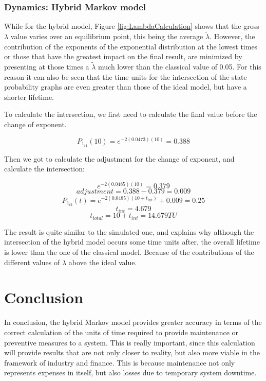 \documentclass{article}
\begin{document}
\begin{doublespacing}
\subsubsection{Dynamics: Hybrid Markov model}

\par While for the hybrid model, Figure \ref{fig:LambdaCalculation} shows that the gross $\lambda$ value varies over an equilibrium point, this being the average $\tilde{\lambda}$. However, the contribution of the exponents of the exponential distribution at the lowest times or those that have the greatest impact on the final result, are minimized by presenting at those times a $\tilde{\lambda}$ much lower than the classical value of 0.05. For this reason it can also be seen that the time units for the intersection of the state probability graphs are even greater than those of the ideal model, but have a shorter lifetime.

\par To calculate the intersection, we first need to calculate the final value before the change of exponent.

$$ P_{1_{t1}} (10)=e^{-2(0.0473)(10)}=0.388$$

\par Then we got to calculate the adjustment for the change of exponent, and calculate the intersection:

$$ e^{-2(0.0485)(10)}=0.379$$
$$ \textit{adjustment}= 0.388-0.379=0.009$$
$$ P_{1_{t2}} (t)=e^{-2(0.0485)(10+t_{int})}+0.009=0.25$$
$$ t_{int} = 4.679$$
$$t_{total} = 10 + t_{int}=14.679 \textit{TU}$$

\par The result is quite similar to the simulated one, and explains why although the intersection of the hybrid model occurs some time units after, the overall lifetime is lower than the one of the classical model. Because of the contributions of the different values of $\lambda$ above the ideal value.





\newpage
\section{Conclusion}

\par In conclusion, the hybrid Markov model provides greater accuracy in terms of the correct calculation of the units of time required to provide maintenance or preventive measures to a system. This is really important, since this calculation will provide results that are not only closer to reality, but also more viable in the framework of industry and finance. This is because maintenance not only represents expenses in itself, but also losses due to temporary system downtime.


\end{doublespacing}
\end{document}
